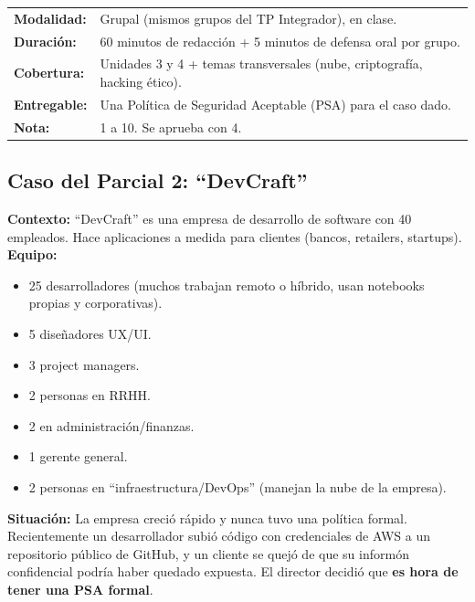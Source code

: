 \documentclass[12pt,a4paper]{article}
\renewcommand{\arraystretch}{1.25}
\begin{document}
\begin{cajaParcial}[title={Ficha t\'ecnica del Parcial 2}]
\renewcommand{\arraystretch}{1.5}
\begin{tabularx}{\textwidth}{>{\bfseries}p{4cm}X}
\textbf{Modalidad:} & Grupal (mismos grupos del TP Integrador), en clase. \\
\textbf{Duraci\'on:} & 60 minutos de redacci\'on + 5 minutos de defensa oral por grupo. \\
\textbf{Cobertura:} & Unidades 3 y 4 + temas transversales (nube, criptograf\'ia, hacking \'etico). \\
\textbf{Entregable:} & Una Pol\'itica de Seguridad Aceptable (PSA) para el caso dado. \\
\textbf{Nota:} & 1 a 10. Se aprueba con 4. \\
\end{tabularx}
\end{cajaParcial}

\subsection{Caso del Parcial 2: ``DevCraft''}

\begin{tcolorbox}[colback=grisClaro, colframe=azulGobierno, arc=3mm]
\textbf{Contexto:} ``DevCraft'' es una empresa de desarrollo de software con 40 empleados. Hace aplicaciones a medida para clientes (bancos, retailers, startups).\\[4pt]
\textbf{Equipo:}
\begin{itemize}[leftmargin=1.5em]
    \item 25 desarrolladores (muchos trabajan remoto o h\'ibrido, usan notebooks propias y corporativas).
    \item 5 dise\~nadores UX/UI.
    \item 3 project managers.
    \item 2 personas en RRHH.
    \item 2 en administraci\'on/finanzas.
    \item 1 gerente general.
    \item 2 personas en ``infraestructura/DevOps'' (manejan la nube de la empresa).
\end{itemize}
\textbf{Situaci\'on:} La empresa creci\'o r\'apido y nunca tuvo una pol\'itica formal. Recientemente un desarrollador subi\'o c\'odigo con credenciales de AWS a un repositorio p\'ublico de GitHub, y un cliente se quej\'o de que su inform\'on confidencial podr\'ia haber quedado expuesta. El director decidi\'o que \textbf{es hora de tener una PSA formal}.
\end{tcolorbox}
\end{document}
